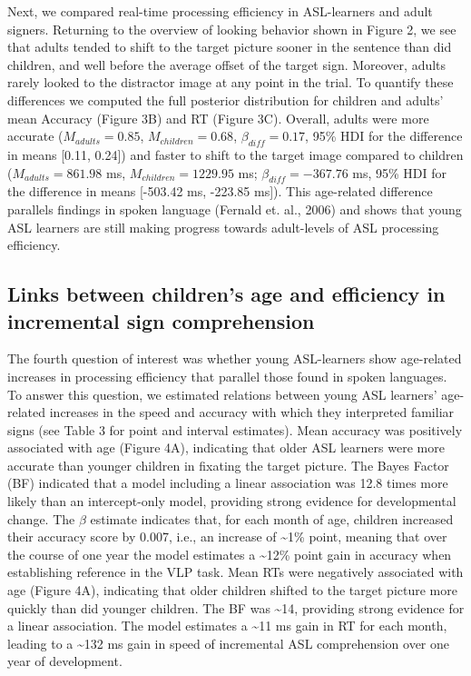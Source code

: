 \documentclass[oneside]{report}
\begin{document}
Next, we compared real-time processing efficiency in ASL-learners and
adult signers. Returning to the overview of looking behavior shown in
Figure 2, we see that adults tended to shift to the target picture
sooner in the sentence than did children, and well before the average
offset of the target sign. Moreover, adults rarely looked to the
distractor image at any point in the trial. To quantify these
differences we computed the full posterior distribution for children and
adults' mean Accuracy (Figure 3B) and RT (Figure 3C). Overall, adults
were more accurate (\(M_{adults}= 0.85\), \(M_{children} = 0.68\),
\(\beta_{diff} = 0.17\), 95\% HDI for the difference in means {[}0.11,
0.24{]}) and faster to shift to the target image compared to children
(\(M_{adults}= 861.98\) ms, \(M_{children} = 1229.95\) ms;
\(\beta_{diff} = -367.76\) ms, 95\% HDI for the difference in means
{[}-503.42 ms, -223.85 ms{]}). This age-related difference parallels
findings in spoken language (Fernald et. al., 2006) and shows that young
ASL learners are still making progress towards adult-levels of ASL
processing efficiency.

\subsection{Links between children's age and efficiency in incremental
sign
comprehension}\label{links-between-childrens-age-and-efficiency-in-incremental-sign-comprehension}

The fourth question of interest was whether young ASL-learners show
age-related increases in processing efficiency that parallel those found
in spoken languages. To answer this question, we estimated relations
between young ASL learners' age-related increases in the speed and
accuracy with which they interpreted familiar signs (see Table 3 for
point and interval estimates). Mean accuracy was positively associated
with age (Figure 4A), indicating that older ASL learners were more
accurate than younger children in fixating the target picture. The Bayes
Factor (BF) indicated that a model including a linear association was
12.8 times more likely than an intercept-only model, providing strong
evidence for developmental change. The \(\beta\) estimate indicates
that, for each month of age, children increased their accuracy score by
0.007, i.e., an increase of \textasciitilde{}1\% point, meaning that
over the course of one year the model estimates a \textasciitilde{}12\%
point gain in accuracy when establishing reference in the VLP task. Mean
RTs were negatively associated with age (Figure 4A), indicating that
older children shifted to the target picture more quickly than did
younger children. The BF was \textasciitilde{}14, providing strong
evidence for a linear association. The model estimates a
\textasciitilde{}11 ms gain in RT for each month, leading to a
\textasciitilde{}132 ms gain in speed of incremental ASL comprehension
over one year of development.
\end{document}
